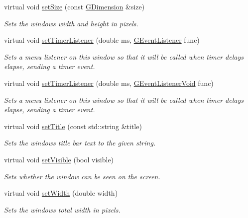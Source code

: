 \begin{DoxyCompactItemize}
virtual void \mbox{\hyperlink{classsgl_1_1GWindow_ae2b628228f192c2702c4ce941b2af68f}{set\+Size}} (const \mbox{\hyperlink{structsgl_1_1GDimension}{G\+Dimension}} \&size)
\begin{DoxyCompactList}\small\item\em Sets the window\textquotesingle{}s width and height in pixels. \end{DoxyCompactList}\item 
virtual void \mbox{\hyperlink{classsgl_1_1GWindow_ae0d5df4c2ed47156cbba7da55362e4e1}{set\+Timer\+Listener}} (double ms, \mbox{\hyperlink{namespacesgl_ae9f3e9eab70035da1a2b114e21357b25}{G\+Event\+Listener}} func)
\begin{DoxyCompactList}\small\item\em Sets a menu listener on this window so that it will be called when timer delays elapse, sending a timer event. \end{DoxyCompactList}\item 
virtual void \mbox{\hyperlink{classsgl_1_1GWindow_ae23e03c86580bbcefc2dee4d01d08091}{set\+Timer\+Listener}} (double ms, \mbox{\hyperlink{namespacesgl_a54427ce97bb1c2804e4fe2b0a62e8b17}{G\+Event\+Listener\+Void}} func)
\begin{DoxyCompactList}\small\item\em Sets a menu listener on this window so that it will be called when timer delays elapse, sending a timer event. \end{DoxyCompactList}\item 
virtual void \mbox{\hyperlink{classsgl_1_1GWindow_abc79cf0667bbb5c93fca3f01b52c7b57}{set\+Title}} (const std\+::string \&title)
\begin{DoxyCompactList}\small\item\em Sets the window\textquotesingle{}s title bar text to the given string. \end{DoxyCompactList}\item 
virtual void \mbox{\hyperlink{classsgl_1_1GWindow_a18e44e30b31525a243960ca3928125aa}{set\+Visible}} (bool visible)
\begin{DoxyCompactList}\small\item\em Sets whether the window can be seen on the screen. \end{DoxyCompactList}\item 
virtual void \mbox{\hyperlink{classsgl_1_1GWindow_aa3f3fba4cb131baa8696ba01e3bceca1}{set\+Width}} (double width)
\begin{DoxyCompactList}\small\item\em Sets the window\textquotesingle{}s total width in pixels. \end{DoxyCompactList}\item 

\end{DoxyCompactItemize}
